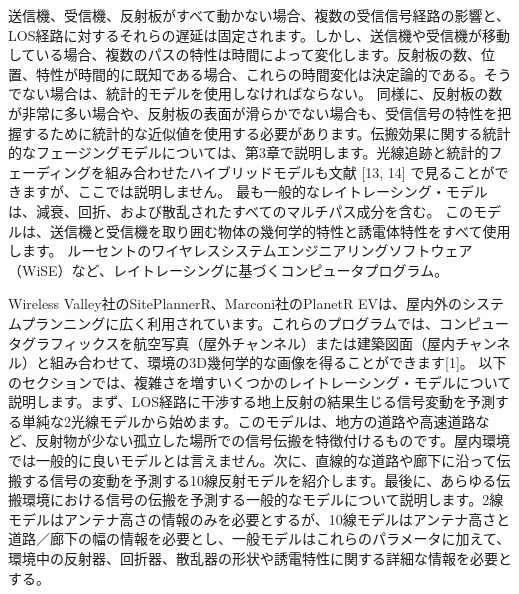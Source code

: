 \documentclass[dvipdfmx]{jsarticle}
\begin{document}
送信機、受信機、反射板がすべて動かない場合、複数の受信信号経路の影響と、LOS経路に対するそれらの遅延は固定されます。しかし、送信機や受信機が移動している場合、複数のパスの特性は時間によって変化します。反射板の数、位置、特性が時間的に既知である場合、これらの時間変化は決定論的である。そうでない場合は、統計的モデルを使用しなければならない。
同様に、反射板の数が非常に多い場合や、反射板の表面が滑らかでない場合も、受信信号の特性を把握するために統計的な近似値を使用する必要があります。伝搬効果に関する統計的なフェージングモデルについては、第3章で説明します。光線追跡と統計的フェーディングを組み合わせたハイブリッドモデルも文献 [13, 14] で見ることができますが、ここでは説明しません。
最も一般的なレイトレーシング・モデルは、減衰、回折、および散乱されたすべてのマルチパス成分を含む。
このモデルは、送信機と受信機を取り囲む物体の幾何学的特性と誘電体特性をすべて使用します。
ルーセントのワイヤレスシステムエンジニアリングソフトウェア（WiSE）など、レイトレーシングに基づくコンピュータプログラム。


Wireless Valley社のSitePlannerR、Marconi社のPlanetR EVは、屋内外のシステムプランニングに広く利用されています。これらのプログラムでは、コンピュータグラフィックスを航空写真（屋外チャンネル）または建築図面（屋内チャンネル）と組み合わせて、環境の3D幾何学的な画像を得ることができます[1]。
以下のセクションでは、複雑さを増すいくつかのレイトレーシング・モデルについて説明します。まず、LOS経路に干渉する地上反射の結果生じる信号変動を予測する単純な2光線モデルから始めます。このモデルは、地方の道路や高速道路など、反射物が少ない孤立した場所での信号伝搬を特徴付けるものです。屋内環境では一般的に良いモデルとは言えません。次に、直線的な道路や廊下に沿って伝搬する信号の変動を予測する10線反射モデルを紹介します。最後に、あらゆる伝搬環境における信号の伝搬を予測する一般的なモデルについて説明します。2線モデルはアンテナ高さの情報のみを必要とするが、10線モデルはアンテナ高さと道路／廊下の幅の情報を必要とし、一般モデルはこれらのパラメータに加えて、環境中の反射器、回折器、散乱器の形状や誘電特性に関する詳細な情報を必要とする。
\end{document}
